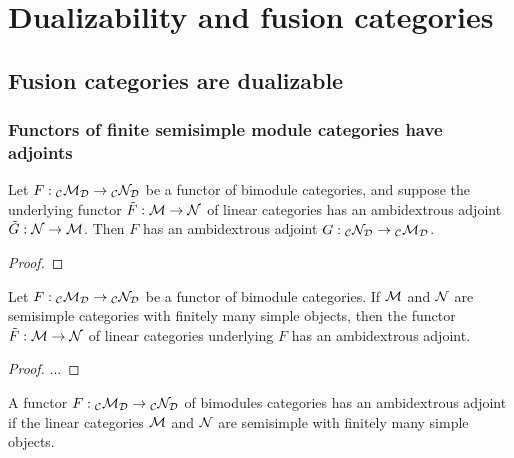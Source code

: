 \documentclass{amsart}
\begin{document}
\section{Dualizability and fusion categories} \label{sec-dualfusion}


\subsection{Fusion categories are dualizable} \label{sec-df-fcd}


\subsubsection{Functors of finite semisimple module categories have adjoints} \label{sec-df-functors}


\begin{lemma}
Let $F: {}_{\mathcal C} {\mathcal M}_{\mathcal D} \rightarrow {}_{\mathcal C} {\mathcal N}_{\mathcal D}$ be a functor of bimodule categories, and suppose the underlying functor $\tilde{F}: \mathcal M \rightarrow \mathcal N$ of linear categories has an ambidextrous adjoint $\tilde{G}: \mathcal N \rightarrow \mathcal M$.  Then $F$ has an ambidextrous adjoint $G: {}_{\mathcal C} {\mathcal N}_{\mathcal D} \rightarrow {}_{\mathcal C} {\mathcal M}_{\mathcal D}$.
\end{lemma}

\begin{proof}
\end{proof}

\begin{lemma}
Let $F: {}_{\mathcal C} {\mathcal M}_{\mathcal D} \rightarrow {}_{\mathcal C} {\mathcal N}_{\mathcal D}$ be a functor of bimodule categories.  If $\mathcal M$ and $\mathcal N$ are semisimple categories with finitely many simple objects, then the functor $\tilde{F}: \mathcal M \rightarrow \mathcal N$ of linear categories underlying $F$ has an ambidextrous adjoint.
\end{lemma}

\begin{proof}
...
\end{proof}

\begin{proposition} \label{prop-functadj}
A functor $F: {}_{\mathcal C} {\mathcal M}_{\mathcal D} \rightarrow {}_{\mathcal C} {\mathcal N}_{\mathcal D}$ of bimodules categories has an ambidextrous adjoint if the linear categories $\mathcal M$ and $\mathcal N$ are semisimple with finitely many simple objects.
\end{proposition}
\end{document}
